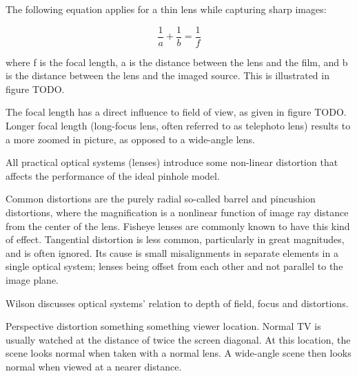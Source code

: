 The following equation applies for a thin lens while capturing sharp images:

\begin{equation}
	\frac{1}{a} + \frac{1}{b} = \frac{1}{f} \label{eq:focal}
\end{equation}

where f is the focal length, a is the distance between the lens and the film, and b is the distance between the lens and the imaged source. This is illustrated in figure TODO.

The focal length has a direct influence to field of view, as given in figure TODO. Longer focal length (long-focus lens, often referred to as telephoto lens) results to a more zoomed in picture, as opposed to a wide-angle lens. 

All practical optical systems (lenses) introduce some non-linear distortion that affects the performance of the ideal pinhole model.

Common distortions are the purely radial so-called barrel and pincushion distortions, where the magnification is a nonlinear function of image ray distance from the center of the lens.
Fisheye lenses are commonly known to have this kind of effect.
Tangential distortion is less common, particularly in great magnitudes, and is often ignored. Its cause is small misalignments in separate elements in a single optical system; lenses being offset from each other and not parallel to the image plane.

Wilson \cite{wilson2004anton} discusses optical systems' relation to depth of field, focus and distortions.

Perspective distortion something something viewer location. Normal TV is usually watched at the distance of twice the screen diagonal. At this location, the scene looks normal when taken with a normal lens. A wide-angle scene then looks normal when viewed at a nearer distance. \cite{wilson2004anton}




